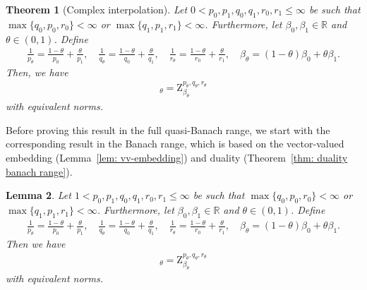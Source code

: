 \documentclass[11pt, leqno,parskip=half]{amsart}
\newtheorem{theorem}{Theorem}[section]
\newtheorem{lemma}[theorem]{Lemma}
\theoremstyle{definition}
\newcommand{\IR}{\mathbb{R}}
\newcommand{\Z}{\mathrm{Z}}
\numberwithin{equation}{section}
\begin{document}
\begin{theorem}[Complex interpolation]
\label{thm: complex int full range}
    Let $0< p_0,p_1,q_0,q_1, r_0,r_1\leq \infty$ be such that $\max\{q_0 , p_0, r_0\}<\infty$ or $\max\{q_1,p_1,r_1\}<\infty$. Furthermore, let $\beta_0,\beta_1\in\IR$ and $\theta\in (0,1)$. Define
    \begin{align*}
        \frac{1}{p_\theta} = \frac{1-\theta}{p_0} + \frac{\theta}{p_1},\quad \frac{1}{q_\theta} = \frac{1-\theta}{q_0} + \frac{\theta}{q_1},\quad \frac{1}{r_\theta} = \frac{1-\theta}{r_0} + \frac{\theta}{r_1}, \quad \beta_\theta = (1-\theta)\beta_0 + \theta \beta_1.
    \end{align*}
    Then, we have
    \begin{align*}
        [\Z^{p_0,q_0,r_0}_{\beta_0} , \Z^{p_1,q_1,r_1}_{\beta_1} ]_{\theta} = \Z^{p_\theta, q_\theta,r_\theta}_{\beta_\theta}
    \end{align*}
    with equivalent norms.
\end{theorem}



Before proving this result in the full quasi-Banach range, we start with the corresponding result in the Banach range, which is based on the vector-valued embedding (Lemma~\ref{lem: vv-embedding}) and duality (Theorem~\ref{thm: duality banach range}).



\begin{lemma}
\label{lem: complex int 1<}
    Let $1< p_0,p_1,q_0,q_1, r_0,r_1\leq \infty$ be such that $\max\{q_0, p_0, r_0\}<\infty$ or $\max\{q_1, p_1, r_1\}<\infty$. Furthermore, let $\beta_0,\beta_1\in\IR$ and $\theta\in (0,1)$. Define
    \begin{align*}
        \frac{1}{p_\theta} = \frac{1-\theta}{p_0} + \frac{\theta}{p_1},\quad \frac{1}{q_\theta} = \frac{1-\theta}{q_0} + \frac{\theta}{q_1},\quad \frac{1}{r_\theta} = \frac{1-\theta}{r_0} + \frac{\theta}{r_1}, \quad \beta_\theta = (1-\theta)\beta_0 + \theta \beta_1.
    \end{align*}
    Then we have
    \begin{align*}
        [\Z^{p_0,q_0,r_0}_{\beta_0} , \Z^{p_1,q_1,r_1}_{\beta_1} ]_{\theta} = \Z^{p_\theta, q_\theta,r_\theta}_{\beta_\theta}
    \end{align*}
    with equivalent norms.
\end{lemma}
\end{document}
